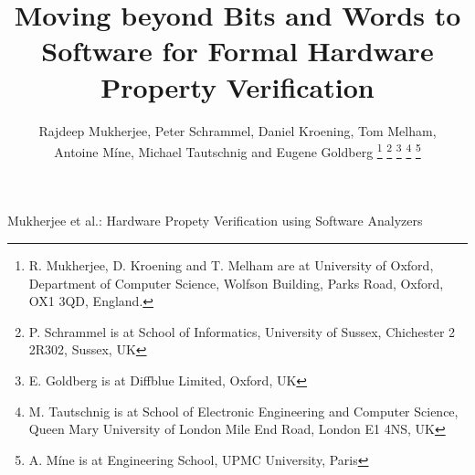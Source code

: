 \documentclass[journal]{IEEEtran}
\theoremstyle{definition}
\begin{document}
\title{Moving beyond Bits and Words to Software for Formal Hardware Property Verification}

\author{Rajdeep Mukherjee, 
        Peter Schrammel,
        Daniel Kroening, 
        Tom Melham, \\
        Antoine M{\'i}ne,
        Michael Tautschnig and
        Eugene Goldberg
        \thanks{R. Mukherjee, D. Kroening and T. Melham are at 
                University of Oxford, Department of Computer Science,
                Wolfson Building, Parks Road,
                Oxford, OX1 3QD, England.}
        \thanks{P. Schrammel is at School of Informatics, University of Sussex, 
                Chichester 2 2R302, Sussex, UK}
        \thanks{E. Goldberg is at Diffblue Limited, Oxford, UK}
        \thanks{M. Tautschnig is at 
                School of Electronic Engineering and Computer Science,
                Queen Mary University of London
                Mile End Road, London E1 4NS, UK}
        \thanks{A. M{\'i}ne is at Engineering School, UPMC University, Paris}}
%
         {Mukherjee et al.: Hardware Propety Verification using Software Analyzers}

\maketitle
\end{document}
